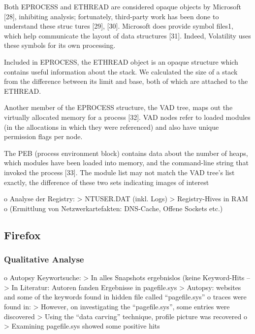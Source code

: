 		Both EPROCESS and ETHREAD are considered opaque objects by Microsoft [28], inhibiting analysis; fortunately, third-party work has been done to understand these struc tures [29], [30]. Microsoft does provide symbol files1, which help communicate the layout of data structures [31]. Indeed, Volatility uses these symbols for its own processing.
		
		Included in EPROCESS, the ETHREAD object is an opaque structure which contains useful information about the stack. We calculated the size of a stack from the difference between its limit and base, both of which are attached to the ETHREAD.
		
		Another member of the EPROCESS structure, the VAD tree, maps out the virtually allocated memory for a process [32]. VAD nodes refer to loaded modules (in the allocations in which they were referenced) and also have unique permission flags per node.
		
		The PEB (process environment block) contains data about the number of heaps, which modules have been loaded into memory, and the command-line string that invoked the process [33]. The module list may not match the VAD tree’s list
		exactly, the difference of these two sets indicating images of interest
		
		
			
		
o	Analyse der Registry:
	>	NTUSER.DAT (inkl. Logs)
 	>	Registry-Hives in RAM
o	(Ermittlung von Netzwerkartefakten: DNS-Cache, Offene Sockets etc.)


\subsection{Firefox}

\subsubsection*{Qualitative Analyse}



o	Autopsy Keywortsuche: 
	>	In alles Snapshots ergebnislos (keine Keyword-Hits
	-->	In Literatur: Autoren fanden Ergebnisse in pagefile.sys 
		> Autopsy: websites and some of the keywords found in hidden file called “pagefile.sys” \cite{Mahlous.2020}
		o \cite{Montasari.2015} traces were found in: 
			> However, on investigating the “pagefile.sys”, some entries were discovered
			> Using the “data carving” technique, profile picture was recovered
		o \cite{Said.2011} 
			> Examining pagefile.sys showed some positive hits 
			
